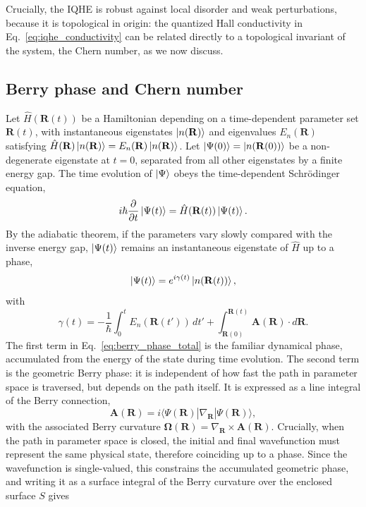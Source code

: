 Crucially, the IQHE is robust against local disorder and weak perturbations, because it is topological in origin: the quantized Hall conductivity in Eq.~\eqref{eq:iqhe_conductivity} can be related directly to a topological invariant of the system, the Chern number, as we now discuss.

\subsection{Berry phase and Chern number}\label{sec:berry_phase}
Let $\hat{H}(\mathbf{R}(t))$ be a Hamiltonian depending on a time-dependent parameter set $\mathbf{R}(t)$, with instantaneous eigenstates $\ket{n(\mathbf{R})}$ and eigenvalues $E_n(\mathbf{R})$ satisfying $\hat{H}(\mathbf{R}) \ket{n(\mathbf{R})} = E_n(\mathbf{R}) \ket{n(\mathbf{R})}$. Let $\ket{\Psi(0)} = \ket{n(\mathbf{R}(0))}$ be a non-degenerate eigenstate at $t=0$, separated from all other eigenstates by a finite energy gap. The time evolution of $\ket{\Psi}$ obeys the time-dependent Schr\"odinger equation,
\begin{equation}
    i \hbar \frac{\partial}{\partial t} \ket{\Psi(t)} = \hat{H}(\mathbf{R}(t)) \ket{\Psi(t)}.
\end{equation}
By the adiabatic theorem, if the parameters vary slowly compared with the inverse energy gap, $\ket{\Psi(t)}$ remains an instantaneous eigenstate of $\hat{H}$ up to a phase,
\begin{equation}
    \ket{\Psi(t)} = e^{i \gamma(t)} \ket{n(\mathbf{R}(t))},
\end{equation}
with
\begin{equation}
    \gamma(t) = -\frac{1}{\hbar} \int_0^t E_n(\mathbf{R}(t')) \, dt' + \int_{\mathbf{R}(0)}^{\mathbf{R}(t)} \mathbf{A}(\mathbf{R}) \cdot d\mathbf{R}.
    \label{eq:berry_phase_total}
\end{equation}
The first term in Eq.~\eqref{eq:berry_phase_total} is the familiar dynamical phase, accumulated from the energy of the state during time evolution. The second term is the geometric Berry phase: it is independent of how fast the path in parameter space is traversed, but depends on the path itself. It is expressed as a line integral of the Berry connection,
\begin{equation}
    \mathbf{A}(\mathbf{R}) = i \langle \Psi(\mathbf{R}) | \nabla_\mathbf{R} | \Psi(\mathbf{R}) \rangle,
\end{equation}
with the associated Berry curvature $\mathbf{\Omega}(\mathbf{R}) = \nabla_\mathbf{R} \times \mathbf{A}(\mathbf{R})$. Crucially, when the path in parameter space is closed, the initial and final wavefunction must represent the same physical state, therefore coinciding up to a phase. Since the wavefunction is single-valued, this constrains the accumulated geometric phase, and writing it as a surface integral of the Berry curvature over the enclosed surface $S$ gives
